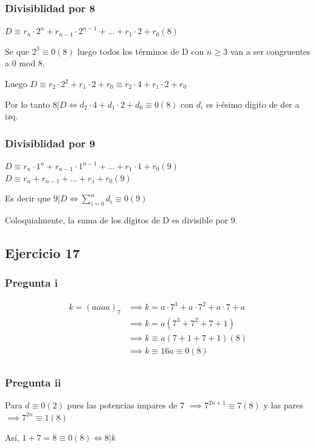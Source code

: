 \subsubsection{Divisiblidad por 8}
$ D \equiv r_n \cdot 2^n + r_{n-1}\cdot 2^{n-1}+...+r_1 \cdot 2 + r_0 (8)$

Se que $ 2^3 \equiv 0 (8) $ luego todos los términos de D con $ n \geq 3 $ van a ser congruentes a 0 mod 8.

Luego $ D \equiv r_2 \cdot 2^2 + r_1 \cdot 2 + r_0 \equiv r_2 \cdot 4 + r_1 \cdot 2 + r_0 $

Por lo tanto $ 8|D \iff d_2 \cdot 4 + d_1 \cdot 2 + d_0 \equiv 0(8) $ con $d_i$ es i-ésimo digito de der a izq.

\subsubsection{Divisiblidad por 9}
$ D \equiv r_n \cdot 1^n + r_{n-1}\cdot 1^{n-1}+...+r_1 \cdot 1 + r_0 (9)$ \\
$ D \equiv r_n + r_{n-1} +...+ r_1 + r_0 (9)$

Es decir que $ 9|D \iff \sum_{i=0}^{n}d_i \equiv 0(9)$

Coloquialmente, la suma de los dígitos de D es divisible por 9.

\subsection{Ejercicio 17}
\subsubsection{Pregunta i}
\begin{align*}
    k = (aaaa)_7 &\implies k = a\cdot 7^3 + a\cdot 7^2 + a \cdot 7 + a \\
    &\implies k = a(7^3+7^2+7+1) \\
    &\implies k \equiv a(7+1+7+1)(8) \\
    &\implies k \equiv 16a \equiv 0(8) \\
\end{align*}

\subsubsection{Pregunta ii}
Para $ d \equiv 0 (2) $ pues las potencias impares de 7 $ \implies 7^{2n+1}\equiv 7 (8) $ y las pares $ \implies 7^{2n}\equiv 1 (8) $

Así, $ 1+7= 8 \equiv 0(8) \iff 8|k $

